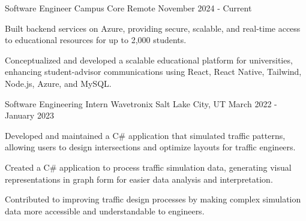 \begin{cventries}

\cventry
{Software Engineer} %
{Campus Core} %
{Remote} %
{November 2024 - Current} %
{ %
\begin{cvitems}
\item {Built backend services on Azure, providing secure, scalable, and real-time access to educational resources for up to 2,000 students.}
\item {Conceptualized and developed a scalable educational platform for universities, enhancing student-advisor communications using React, React Native, Tailwind, Node.js, Azure, and MySQL.}
\end{cvitems}
}


\cventry
{Software Engineering Intern} %
{Wavetronix} %
{Salt Lake City, UT} %
{March 2022 - January 2023} %
{ %
\begin{cvitems}
\item {Developed and maintained a C\# application that simulated traffic patterns, allowing users to design intersections and optimize layouts for traffic engineers.}
\item {Created a C\# application to process traffic simulation data, generating visual representations in graph form for easier data analysis and interpretation.}
\item {Contributed to improving traffic design processes by making complex simulation data more accessible and understandable to engineers.}
\end{cvitems}
}


\end{cventries}